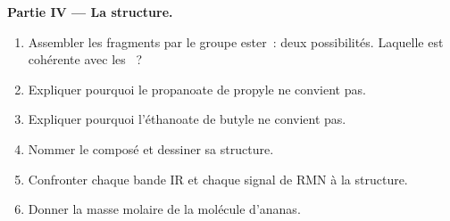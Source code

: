 \begin{problem}
\medskip
\noindent\textbf{Partie IV --- La structure.}
\begin{enumerate}[resume]
  \item Assembler les fragments par le groupe ester~: deux possibilités.
        Laquelle est cohérente avec les ~?
  \item Expliquer pourquoi le propanoate de propyle ne convient pas.
  \item Expliquer pourquoi l'éthanoate de butyle ne convient pas.
  \item Nommer le composé et dessiner sa structure.
  \item Confronter chaque bande IR et chaque signal de RMN à la structure.
  \item Donner la masse molaire de la molécule d'ananas.
\end{enumerate}
\end{problem}
